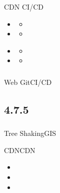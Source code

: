 
CDN CI/CD


\begin{itemize}
\item
  \begin{itemize}
  \tightlist
  \item
  \end{itemize}
\item
  \begin{itemize}
  \tightlist
  \item
  \end{itemize}
\end{itemize}


\begin{itemize}
\item
  \begin{itemize}
  \tightlist
  \item
  \end{itemize}
\item
  \begin{itemize}
  \tightlist
  \item
  \end{itemize}
\end{itemize}

\hypertarget{section-91}{%
\subsubsection{}\label{section-91}}

Web \important{} GitCI/CD

\hypertarget{section-92}{%
\subsection{4.7.5}\label{section-92}}

\hypertarget{section-93}{%
\subsubsection{}\label{section-93}}


\important{}

\important{}\important{}Tree ShakingGIS


CDNCDN

\begin{itemize}
\item
  \important{}
\item
  \important{}
\item
  \important{}
\end{itemize}

